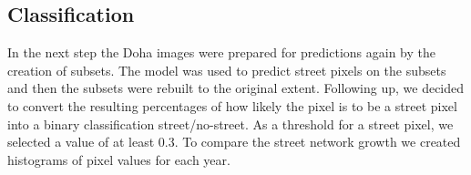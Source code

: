 \documentclass[
]{article}
\newenvironment{Shaded}{\begin{snugshade}}{\end{snugshade}}
\newcommand{\AttributeTok}[1]{\textcolor[rgb]{0.77,0.63,0.00}{#1}}
\newcommand{\ControlFlowTok}[1]{\textcolor[rgb]{0.13,0.29,0.53}{\textbf{#1}}}
\newcommand{\DecValTok}[1]{\textcolor[rgb]{0.00,0.00,0.81}{#1}}
\newcommand{\FunctionTok}[1]{\textcolor[rgb]{0.00,0.00,0.00}{#1}}
\newcommand{\NormalTok}[1]{#1}
\newcommand{\OtherTok}[1]{\textcolor[rgb]{0.56,0.35,0.01}{#1}}
\newcommand{\SpecialCharTok}[1]{\textcolor[rgb]{0.00,0.00,0.00}{#1}}
\begin{document}
\begin{Shaded}
\end{Shaded}

\hypertarget{classification}{%
\subsection{Classification}\label{classification}}

In the next step the Doha images were prepared for predictions again by
the creation of subsets. The model was used to predict street pixels on
the subsets and then the subsets were rebuilt to the original extent.
Following up, we decided to convert the resulting percentages of how
likely the pixel is to be a street pixel into a binary classification
street/no-street. As a threshold for a street pixel, we selected a value
of at least 0.3. To compare the street network growth we created
histograms of pixel values for each year.
\end{document}
